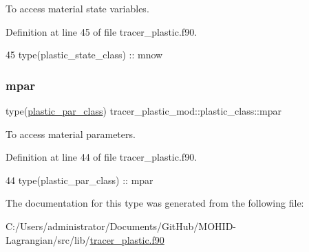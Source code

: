 To access material state variables. 



Definition at line 45 of file tracer\+\_\+plastic.\+f90.


\begin{DoxyCode}
45         \textcolor{keywordtype}{type}(plastic\_state\_class) :: mnow
\end{DoxyCode}
\mbox{\label{structtracer__plastic__mod_1_1plastic__class_ae1a94a8bd2796aa13dfa820845f56563}} 
\subsubsection{\texorpdfstring{mpar}{mpar}}
{\footnotesize\ttfamily type(\mbox{\hyperlink{structtracer__plastic__mod_1_1plastic__par__class}{plastic\+\_\+par\+\_\+class}}) tracer\+\_\+plastic\+\_\+mod\+::plastic\+\_\+class\+::mpar\hspace{0.3cm}{\ttfamily [private]}}



To access material parameters. 



Definition at line 44 of file tracer\+\_\+plastic.\+f90.


\begin{DoxyCode}
44         \textcolor{keywordtype}{type}(plastic\_par\_class)   :: mpar
\end{DoxyCode}


The documentation for this type was generated from the following file\+:\begin{DoxyCompactItemize}
\item 
C\+:/\+Users/administrator/\+Documents/\+Git\+Hub/\+M\+O\+H\+I\+D-\/\+Lagrangian/src/lib/\mbox{\hyperlink{tracer__plastic_8f90}{tracer\+\_\+plastic.\+f90}}\end{DoxyCompactItemize}
